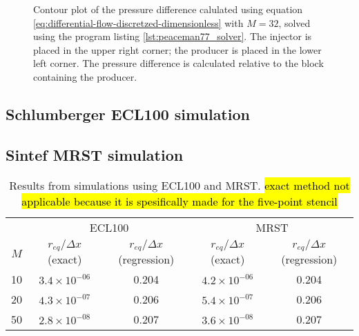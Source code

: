 \begin{figure}[htbp]
    \centering
    \scalebox{0.7}{}
    \caption{Contour plot of the pressure difference calulated using equation \eqref{eq:differential-flow-discretzed-dimensionless} with $M=32$, solved using the program listing \ref{lst:peaceman77_solver}. The injector is placed in the upper right corner; the producer is placed in the lower left corner. The pressure difference is calculated relative to the block containing the producer.}
    \label{fig:pressure_drop_contour}
\end{figure}






\subsection{Schlumberger ECL100 simulation} %
\label{sub:schlumberger_ecl100_simulation_results}





\subsection{Sintef MRST simulation} %
\label{sub:sintef_mrst_simulation}


\begin{table}[htbp]
\centering
    \caption{Results from simulations using ECL100 and MRST. \hl{exact method not applicable because it is spesifically made for the five-point stencil}}
    \begin{tabular}{c|cc|cc}
        \toprule
            & \multicolumn{2}{c|}{ECL100} & \multicolumn{2}{c}{MRST} \\
        $M$ &  $r_{eq}/\Delta x$ (exact) & $r_{eq}/\Delta x$ (regression) & $r_{eq}/\Delta x$ (exact) & $r_{eq}/\Delta x$ (regression) \\
        \midrule
        10  & $3.4\times 10^{-06}$       & 0.204                          &  $4.2\times 10^{-06}$     & 0.204 \\
        20  & $4.3\times 10^{-07}$       & 0.206                          &  $5.4\times 10^{-07}$     & 0.206 \\
        50  & $2.8\times 10^{-08}$       & 0.207                          &  $3.6\times 10^{-08}$     & 0.207 \\
        \bottomrule
    \end{tabular}
    \label{tbl:simulation-results}
\end{table}


